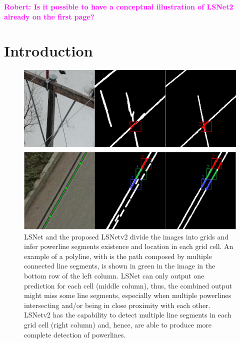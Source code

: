 \documentclass[journal]{IEEEtran}
\newcommand{\commentR}[1]{\textbf{\textcolor{magenta}{Robert: #1}}}
\begin{document}
%
\IEEEpeerreviewmaketitle

\commentR{Is it possible to have a conceptual illustration of LSNet2 already on the first page?}

\section{Introduction}

\begin{figure}[hbt!]
  \includegraphics[width=\linewidth]{imgs/others/first.png}
  \caption{LSNet and the proposed LSNetv2 divide the images into grids and infer powerline segments existence and location in each grid cell. An example of a polyline, with is the path composed by multiple connected line segments, is shown in green in the image in the bottom row of the left column. LSNet can only output one prediction for each cell (middle column), thus, the combined output might miss some line segments, especially when multiple powerlines intersecting and/or being in close proximity with each other. LSNetv2 has the capability to detect multiple line segments in each grid cell (right column) and, hence, are able to produce more complete detection of powerlines.}
  \label{first_examples}
\end{figure}
\end{document}
